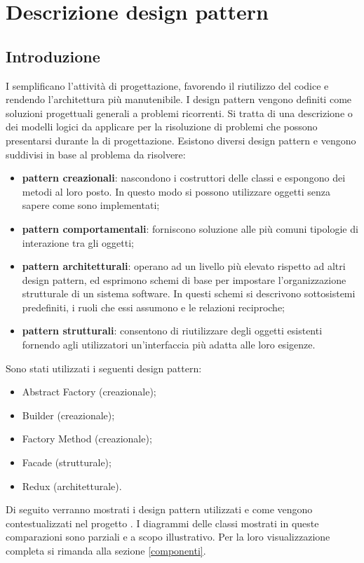 \newpage
\section{Descrizione design pattern}
\subsection{Introduzione}
I  semplificano l'attività di progettazione, favorendo il riutilizzo del codice e rendendo l'architettura più manutenibile. I design pattern vengono definiti come soluzioni progettuali generali a problemi ricorrenti. Si tratta di una descrizione o dei modelli logici da applicare per la risoluzione di problemi che possono presentarsi durante la  di progettazione. Esistono diversi design pattern e vengono suddivisi in base al problema da risolvere:
\begin{itemize}
	\item \textbf{pattern creazionali}: nascondono i costruttori delle classi e espongono dei metodi al loro posto. In questo modo si possono utilizzare oggetti senza sapere come sono implementati;
	\item \textbf{pattern comportamentali}: forniscono soluzione alle più comuni tipologie di interazione tra gli oggetti;
	\item \textbf{pattern architetturali}: operano ad un livello più elevato rispetto ad altri design pattern, ed esprimono schemi di base per impostare l'organizzazione strutturale di un sistema software. In questi schemi si descrivono sottosistemi predefiniti, i ruoli che essi assumono e le relazioni reciproche;
	\item \textbf{pattern strutturali}: consentono di riutilizzare degli oggetti esistenti fornendo agli utilizzatori un'interfaccia più adatta alle loro esigenze.
\end{itemize}
Sono stati utilizzati i seguenti design pattern:
\begin{itemize}
	\item Abstract Factory (creazionale);
	\item Builder (creazionale);
	\item Factory Method (creazionale);
	\item Facade (strutturale);
	\item Redux (architetturale).
\end{itemize}

Di seguito verranno mostrati i design pattern utilizzati e come vengono contestualizzati nel progetto \progetto{}. I diagrammi delle classi mostrati in queste comparazioni sono parziali e a scopo illustrativo. Per la loro visualizzazione completa si rimanda alla sezione \ref{componenti}.

